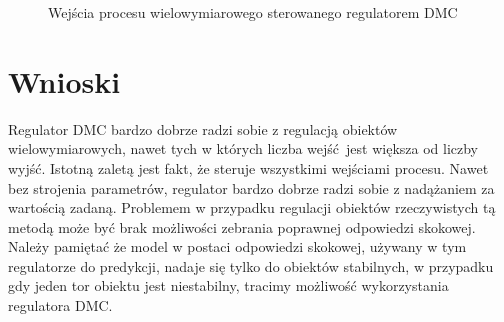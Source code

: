 \begin{figure}
    \begin{subfigure}[b]{\textwidth}
        \centering
    \end{subfigure}
    \caption{Wejścia procesu wielowymiarowego sterowanego regulatorem DMC}
    \label{pro_dmc_2_in}
\end{figure}
\FloatBarrier

\section{Wnioski}
\label{pro_dmc_wnioski}

Regulator DMC bardzo dobrze radzi sobie z regulacją obiektów wielowymiarowych, nawet 
tych w których liczba wejść jest większa od liczby wyjść. Istotną zaletą jest fakt, że 
steruje wszystkimi wejściami procesu. Nawet bez strojenia parametrów,
regulator bardzo dobrze radzi sobie z nadążaniem za wartością zadaną. Problemem w przypadku
regulacji obiektów rzeczywistych tą metodą może być brak możliwości zebrania poprawnej 
odpowiedzi skokowej. Należy pamiętać że model w postaci odpowiedzi skokowej, używany w tym regulatorze
do predykcji, nadaje się tylko do obiektów stabilnych, w przypadku gdy jeden tor obiektu jest
niestabilny, tracimy możliwość wykorzystania regulatora DMC.
